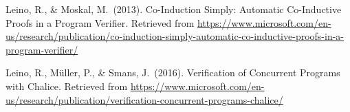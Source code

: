 \documentclass[12pt,twoside]{article}
\begin{document}
{\begin{thebibliography}{222}
\mdbibitemlabel{}Leino, R., \& Moskal, M.~(2013). Co-Induction Simply: Automatic Co-Inductive Proofs in a Program Verifier. Retrieved from \href{https://www.microsoft.com/en-us/research/publication/co-induction-simply-automatic-co-inductive-proofs-in-a-program-verifier/}{{\ttfamily https://\hspace{0pt}www.\hspace{0pt}microsoft.\hspace{0pt}com/\hspace{0pt}en-\hspace{0pt}us/\hspace{0pt}research/\hspace{0pt}publication/\hspace{0pt}co-\hspace{0pt}induction-\hspace{0pt}simply-\hspace{0pt}automatic-\hspace{0pt}co-\hspace{0pt}inductive-\hspace{0pt}proofs-\hspace{0pt}in-\hspace{0pt}a-\hspace{0pt}program-\hspace{0pt}verifier/\hspace{0pt}}}\label{leino_co-induction_2013}%

\mdbibitemlabel{}Leino, R., Müller, P., \& Smans, J.~(2016). Verification of Concurrent Programs with Chalice. Retrieved from \href{https://www.microsoft.com/en-us/research/publication/verification-concurrent-programs-chalice/}{{\ttfamily https://\hspace{0pt}www.\hspace{0pt}microsoft.\hspace{0pt}com/\hspace{0pt}en-\hspace{0pt}us/\hspace{0pt}research/\hspace{0pt}publication/\hspace{0pt}verification-\hspace{0pt}concurrent-\hspace{0pt}programs-\hspace{0pt}chalice/\hspace{0pt}}}\label{leino_verification_2016}%


\end{thebibliography}}
\end{document}
